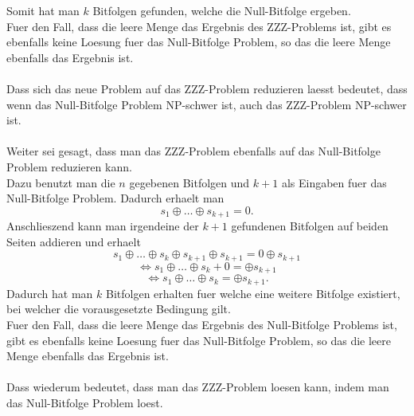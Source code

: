 \documentclass[a4paper,10pt,ngerman]{scrartcl}
\begin{document}
Somit hat man $k$ Bitfolgen gefunden, welche die Null-Bitfolge ergeben.
\\Fuer den Fall, dass die leere Menge das Ergebnis des ZZZ-Problems ist, gibt es ebenfalls keine Loesung fuer das Null-Bitfolge Problem, so das die leere Menge ebenfalls das Ergebnis ist.
\\\\
Dass sich das neue Problem auf das ZZZ-Problem reduzieren laesst bedeutet, dass wenn das Null-Bitfolge Problem NP-schwer ist, auch das ZZZ-Problem NP-schwer ist.
\\\\
Weiter sei gesagt, dass man das ZZZ-Problem ebenfalls auf das Null-Bitfolge Problem reduzieren kann. \\
Dazu benutzt man die $n$ gegebenen Bitfolgen und $k+1$ als Eingaben fuer das Null-Bitfolge Problem. Dadurch erhaelt man 
\[s_1 \oplus \dots \oplus s_{k+1} = 0. \] 
Anschlieszend kann man irgendeine der $k+1$ gefundenen Bitfolgen auf beiden Seiten addieren und erhaelt
\[s_1 \oplus \dots \oplus s_k \oplus s_{k+1} \oplus s_{k+1} = 0 \oplus s_{k+1} \] 
\[ \Leftrightarrow s_1 \oplus \dots \oplus s_{k} + 0 = \oplus s_{k+1} \] 
\[ \Leftrightarrow s_1 \oplus \dots \oplus s_{k} = \oplus s_{k+1}. \] 
Dadurch hat man $k$ Bitfolgen erhalten fuer welche eine weitere Bitfolge existiert, bei welcher die vorausgesetzte Bedingung gilt.
\\Fuer den Fall, dass die leere Menge das Ergebnis des Null-Bitfolge Problems ist, gibt es ebenfalls keine Loesung fuer das Null-Bitfolge Problem, so das die leere Menge ebenfalls das Ergebnis ist.
\\\\
Dass wiederum bedeutet, dass man das ZZZ-Problem loesen kann, indem man das Null-Bitfolge Problem loest.
\end{document}
